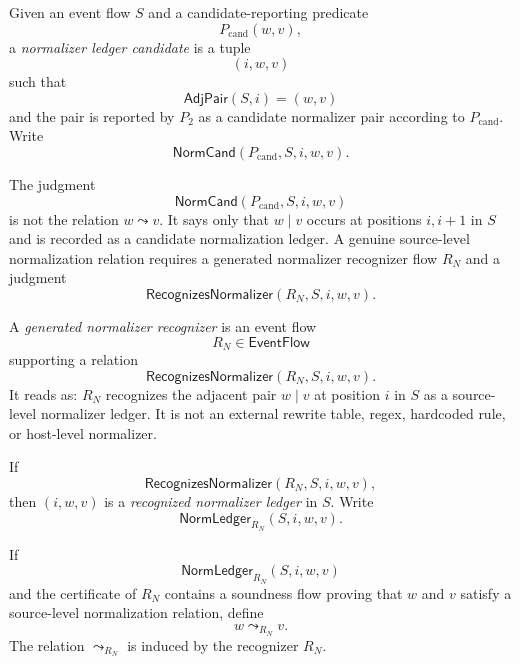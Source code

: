 \begin{definition}
\label{def:source-normalizer-ledger-candidate}
Given an event flow $S$ and a candidate-reporting predicate
$$
  P_{\mathrm{cand}}(w,v),
$$
a \emph{normalizer ledger candidate} is a tuple
$$
  (i,w,v)
$$
such that
$$
  \mathsf{AdjPair}(S,i)=(w,v)
$$
and the pair is reported by $P_2$ as a candidate normalizer pair according to $P_{\mathrm{cand}}$. Write
$$
  \mathsf{NormCand}(P_{\mathrm{cand}},S,i,w,v).
$$
\end{definition}

\begin{remark}
\label{rem:source-normalizer-candidate-not-recognition}
The judgment
$$
  \mathsf{NormCand}(P_{\mathrm{cand}},S,i,w,v)
$$
is not the relation $w\leadsto v$. It says only that $w\mid v$ occurs at positions $i,i+1$ in $S$ and is recorded as a candidate normalization ledger. A genuine source-level normalization relation requires a generated normalizer recognizer flow $R_N$ and a judgment
$$
  \mathsf{RecognizesNormalizer}(R_N,S,i,w,v).
$$
\end{remark}

\begin{definition}
\label{def:source-normalizer-generated-recognizer}
A \emph{generated normalizer recognizer} is an event flow
$$
  R_N\in\mathsf{EventFlow}
$$
supporting a relation
$$
  \mathsf{RecognizesNormalizer}(R_N,S,i,w,v).
$$
It reads as: $R_N$ recognizes the adjacent pair $w\mid v$ at position $i$ in $S$ as a source-level normalizer ledger. It is not an external rewrite table, regex, hardcoded rule, or host-level normalizer.
\end{definition}

\begin{definition}
\label{def:source-normalizer-recognized-ledger}
If
$$
  \mathsf{RecognizesNormalizer}(R_N,S,i,w,v),
$$
then $(i,w,v)$ is a \emph{recognized normalizer ledger} in $S$. Write
$$
  \mathsf{NormLedger}_{R_N}(S,i,w,v).
$$
\end{definition}

\begin{definition}
\label{def:source-normalizer-induced-relation}
If
$$
  \mathsf{NormLedger}_{R_N}(S,i,w,v)
$$
and the certificate of $R_N$ contains a soundness flow proving that $w$ and $v$ satisfy a source-level normalization relation, define
$$
  w\leadsto_{R_N}v.
$$
The relation $\leadsto_{R_N}$ is induced by the recognizer $R_N$.
\end{definition}

